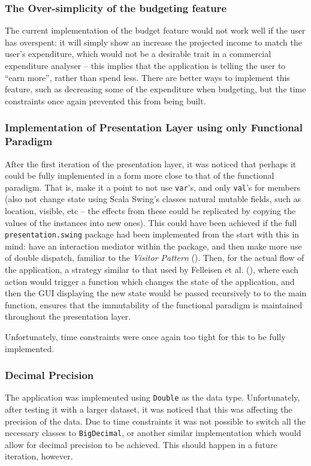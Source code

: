 \subsubsection{The Over-simplicity of the budgeting feature}
The current implementation of the budget feature would not work well if
the user has overspent: it will simply show an increase the projected income to
match the user's expenditure, which would not be a desirable trait in a
commercial expenditure analyser -- this implies that the application is telling
the user to ``earn more'', rather than spend less. There are better ways to
implement this feature, such as decreasing some of the expenditure when
budgeting, but the time constraints once again prevented this from being built.


\subsubsection{Implementation of Presentation Layer using only Functional Paradigm}
After the first iteration of the presentation layer, it was noticed that
perhaps it could be fully implemented in a form more close to that of the
functional paradigm. That is, make it a point to not use \texttt{var}'s, and
only \texttt{val}'s for members (also not change state using Scala Swing's
classes natural mutable fields, such as location, visible, etc -- the effects
from these could be replicated by copying the values of the instances into new
ones). This could have been achieved if the full \texttt{presentation.swing}
package had been implemented from the start with this in mind: have an
interaction mediator within the package, and then make more use of double
dispatch, familiar to the \emph{Visitor Pattern}
(\cite[][Ch.~8,~Location~3943]{nikolov2016scala}). Then, for the actual flow of
the application, a strategy similar to that used by Felleisen et al.
(\citeyear[][Ch.~5]{felleisen2013realm}), where each action would trigger a
function which changes the state of the application, and then the GUI
displaying the new state would be passed recursively to to the main function,
ensures that the immutability of the functional paradigm is maintained
throughout the presentation layer.

Unfortunately, time constraints were once again too tight for this to be fully
implemented.

\subsubsection{Decimal Precision}
The application was implemented using \texttt{Double} as the data type.
Unfortunately, after testing it with a larger dataset, it was noticed that this
was affecting the precision of the data. Due to time constraints it was not
possible to switch all the necessary classes to \texttt{BigDecimal}, or another
similar implementation which would allow for decimal precision to be achieved.
This should happen in a future iteration, however.
